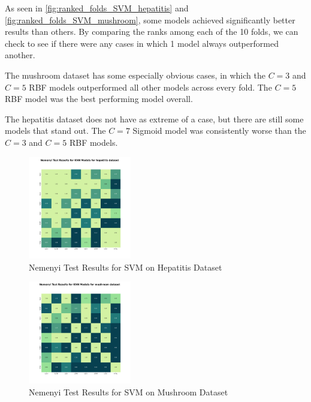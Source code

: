 As seen in \autoref{fig:ranked_folds_SVM_hepatitis} and \autoref{fig:ranked_folds_SVM_mushroom},
some models achieved significantly better results than others. By comparing the ranks among each of the 10 folds,
we can check to see if there were any cases in which 1 model always outperformed another.

The mushroom dataset has some especially obvious cases, in which the $C=3$ and $C=5$ RBF models
outperformed all other models across every fold. The $C=5$ RBF model was the best performing model overall.

The hepatitis dataset does not have as extreme of a case, but there are still some models that stand out.
The $C=7$ Sigmoid model was consistently worse than the $C=3$ and $C=5$ RBF models.

\begin{figure}
    \centering
    \includegraphics[width=0.4\textwidth]{figures/nemenyi_test_results_SVM_hepatitis.png}
    \caption{Nemenyi Test Results for SVM on Hepatitis Dataset}
    \label{fig:nemenyi_test_results_SVM_hepatitis}
\end{figure}

\begin{figure}
    \centering
    \includegraphics[width=0.4\textwidth]{figures/nemenyi_test_results_SVM_mushroom.png}
    \caption{Nemenyi Test Results for SVM on Mushroom Dataset}
    \label{fig:nemenyi_test_results_SVM_mushroom}
\end{figure}

